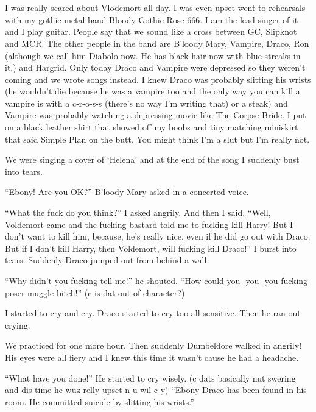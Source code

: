 \section{\chaptername~\thesection}



I was really scared about Vlodemort all day. I was even upset went to rehearsals with my gothic metal band Bloody Gothic Rose 666. I am the lead singer of it and I play guitar. People say that we sound like a cross between GC, Slipknot and MCR\@. The other people in the band are B'loody Mary, Vampire, Draco, Ron (although we call him Diabolo now. He has black hair now with blue streaks in it.) and Hargrid. Only today Draco and Vampire were depressed so they weren't coming and we wrote songs instead. I knew Draco was probably slitting his wrists (he wouldn't die because he was a vampire too and the only way you can kill a vampire is with a c-r-o-s-s (there's no way I'm writing that) or a steak) and Vampire was probably watching a depressing movie like The Corpse Bride. I put on a black leather shirt that showed off my boobs and tiny matching miniskirt that said Simple Plan on the butt. You might think I'm a slut but I'm really not.

We were singing a cover of \enquote*{Helena} and at the end of the song I suddenly bust into tears.

\enquote{Ebony! Are you OK\@?} B'loody Mary asked in a concerted voice.

\enquote{What the fuck do you think?} I asked angrily. And then I said. \enquote{Well, Voldemort came and the fucking bastard told me to fucking kill Harry! But I don't want to kill him, because, he's really nice, even if he did go out with Draco. But if I don't kill Harry, then Voldemort, will fucking kill Draco!} I burst into tears.
Suddenly Draco jumped out from behind a wall.

\enquote{Why didn't you fucking tell me!} he shouted. \enquote{How could you- you- you fucking poser muggle bitch!} (c is dat out of character?)

I started to cry and cry. Draco started to cry too all sensitive. Then he ran out crying.

We practiced for one more hour. Then suddenly Dumbeldore walked in angrily! His eyes were all fiery and I knew this time it wasn't cause he had a headache.

\enquote{What have you done!} He started to cry wisely. (c dats basically nut swering and dis time he wuz relly upset n u wil c y) \enquote{Ebony Draco has been found in his room. He committed suicide by slitting his wrists.}
